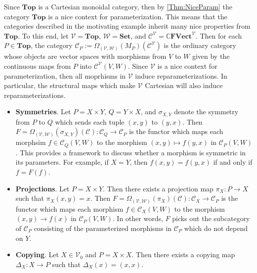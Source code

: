 \begin{exa}
    \label{Ex:CartRot}
    Since $\mathbf{Top}$ is a Cartesian monoidal category, then by \cref{Thm:NiceParam} the category $\mathbf{Top}$ is a nice context for parameterization.
    This means that the categories described in the motivating example inherit many nice properties from $\mathbf{Top}$.
    To this end, let $\mathcal{V} = \mathbf{Top}$, $\mathcal{W} = \mathbf{Set}$, and $\mathcal{C}^{\mathcal{V}} = \mathbb{C}\mathbf{FVect}^{\mathcal{V}}$.
    Then for each $P \in \mathbf{Top}$, the category $\mathcal{C}_P := \Omega_{(\mathcal{V},\mathcal{W})}( M_P )( \mathcal{C}^{\mathcal{V}} )$ is the ordinary category whose objects are vector spaces with morphisms from $V$ to $W$ given by the continuous maps from $P$ into $\mathcal{C}^{\mathcal{V}}( V, W )$.
    Since $\mathcal{V}$ is a nice context for parameterization, then all moprhisms in $\mathcal{V}$ induce reparameterizations.
    In particular, the structural maps which make $\mathcal{V}$ Cartesian will also induce reparameterizations.
    \begin{itemize}
    \item \textbf{Symmetries}.
          Let $P = X \times Y$, $Q = Y \times X$, and $\sigma_{X,Y}$ denote the symmetry from $P$ to $Q$ which sends each tuple $( x, y )$ to $( y, x )$.
          Then $F = \Omega_{(\mathcal{V},\mathcal{W})}( \sigma_{X,Y} )( \mathcal{C} ): \mathcal{C}_Q \to \mathcal{C}_P$ is the functor which maps each morphsim $f \in \mathcal{C}_Q( V, W )$ to the morphism $( x, y ) \mapsto f( y, x )$ in $\mathcal{C}_P( V, W )$.
          This provides a framework to discuss whether a morphism is symmetric in its parameters.
          For example, if $X = Y$, then $f( x, y ) = f( y, x )$ if and only if $f = F( f )$.
    \item \textbf{Projections}.
          Let $P = X \times Y$.
          Then there exists a projection map $\pi_X: P \to X$ such that $\pi_X( x, y ) = x$.
          Then $F = \Omega_{(\mathcal{V},\mathcal{W})}( \pi_X )( \mathcal{C} ): \mathcal{C}_X \to \mathcal{C}_P$ is the functor which maps each morphism $f \in \mathcal{C}_X( V, W )$ to the morphism $( x, y ) \to f( x )$ in $\mathcal{C}_P( V, W )$.
          In other words, $F$ picks out the subcategory of $\mathcal{C}_P$ consisting of the parameterized morphisms in $\mathcal{C}_P$ which do not depend on $Y$.
    \item \textbf{Copying}.
          Let $X \in \mathcal{V}_0$ and $P = X \times X$.
          Then there exists a copying map $\Delta_X: X \to P$ such that $\Delta_X( x ) = ( x, x )$.

\end{itemize}
\end{exa}
